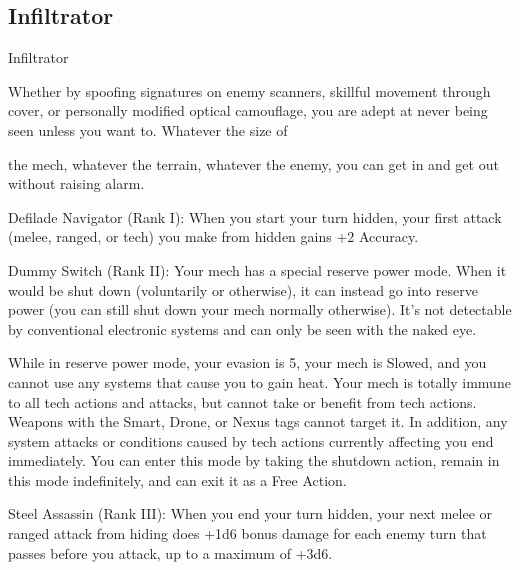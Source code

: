 \subsection{Infiltrator}

                                                    Infiltrator

Whether by spoofing signatures on enemy scanners, skillful movement through cover, or personally
modified optical camouflage, you are adept at never being seen unless you want to. Whatever the size of

the mech, whatever the terrain, whatever the enemy, you can get in and get out without raising alarm.




Defilade Navigator (Rank I): When you start your turn hidden, your first attack (melee, ranged,
or tech) you make from hidden gains +2 Accuracy.

Dummy Switch (Rank II): Your mech has a special reserve power mode. When it would be shut
down (voluntarily or otherwise), it can instead go into reserve power (you can still shut down your
mech normally otherwise). It’s not detectable by conventional electronic systems and can only be
seen with the naked eye.

While in reserve power mode, your evasion is 5, your mech is Slowed, and you cannot use any
systems that cause you to gain heat. Your mech is totally immune to all tech actions and attacks,
but cannot take or benefit from tech actions. Weapons with the Smart, Drone, or Nexus tags
cannot target it. In addition, any system attacks or conditions caused by tech actions currently
affecting you end immediately. You can enter this mode by taking the shutdown action, remain in
this mode indefinitely, and can exit it as a Free Action.

Steel Assassin (Rank III): When you end your turn hidden, your next melee or ranged attack
from hiding does +1d6 bonus damage for each enemy turn that passes before you attack, up to
a maximum of +3d6.